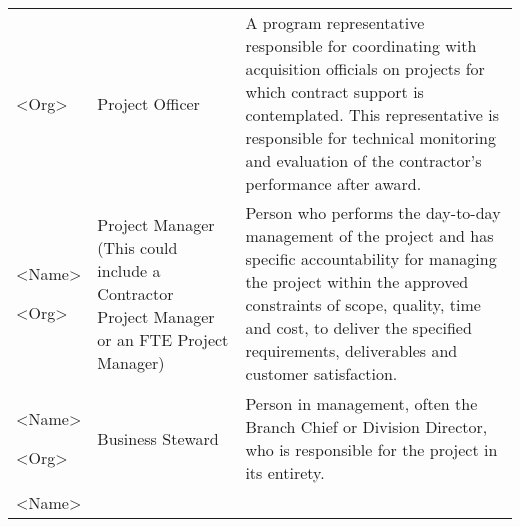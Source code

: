 \documentclass[a4paper, 11pt]{article}
\begin{document}
\begin{longtable}[]{@{}lll@{}}
\begin{minipage}[t]{0.30\columnwidth}
  \textless{}Org\textgreater{}\strut
  \end{minipage} & \begin{minipage}[t]{0.30\columnwidth}\raggedright
  Project Officer\strut
  \end{minipage} & \begin{minipage}[t]{0.30\columnwidth}\raggedright
  A program representative responsible for coordinating with acquisition
  officials on projects for which contract support is contemplated. This
  representative is responsible for technical monitoring and evaluation of
  the contractor's performance after award.\strut
  \end{minipage}\tabularnewline
  \begin{minipage}[t]{0.30\columnwidth}\raggedright
  \textless{}Name\textgreater{}

  \textless{}Org\textgreater{}\strut
  \end{minipage} & \begin{minipage}[t]{0.30\columnwidth}\raggedright
  Project Manager (This could include a Contractor Project Manager or an
  FTE Project Manager)\strut
  \end{minipage} & \begin{minipage}[t]{0.30\columnwidth}\raggedright
  Person who performs the day-to-day management of the project and has
  specific accountability for managing the project within the approved
  constraints of scope, quality, time and cost, to deliver the specified
  requirements, deliverables and customer satisfaction.\strut
  \end{minipage}\tabularnewline
  \begin{minipage}[t]{0.30\columnwidth}\raggedright
  \textless{}Name\textgreater{}

  \textless{}Org\textgreater{}\strut
  \end{minipage} & \begin{minipage}[t]{0.30\columnwidth}\raggedright
  Business Steward\strut
  \end{minipage} & \begin{minipage}[t]{0.30\columnwidth}\raggedright
  Person in management, often the Branch Chief or Division Director, who
  is responsible for the project in its entirety.\strut
  \end{minipage}\tabularnewline
  \begin{minipage}[t]{0.30\columnwidth}\raggedright
  \textless{}Name\textgreater{}


\end{minipage}
\end{longtable}
\end{document}

